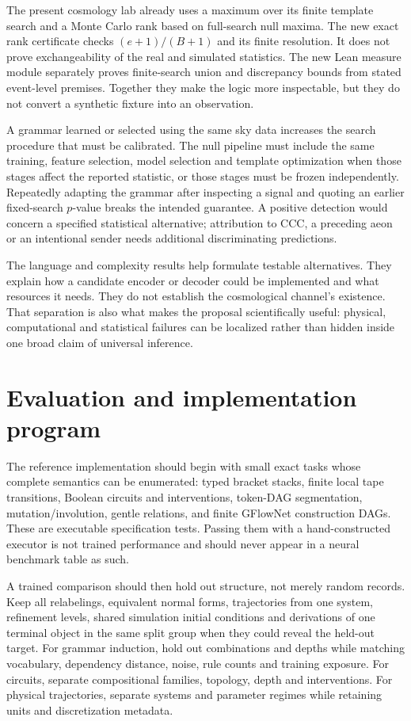 The present cosmology lab already uses a maximum over its finite template search and a Monte Carlo rank based on full-search null maxima. The new exact rank certificate checks $(e+1)/(B+1)$ and its finite resolution. It does not prove exchangeability of the real and simulated statistics. The new Lean measure module separately proves finite-search union and discrepancy bounds from stated event-level premises. Together they make the logic more inspectable, but they do not convert a synthetic fixture into an observation.

A grammar learned or selected using the same sky data increases the search procedure that must be calibrated. The null pipeline must include the same training, feature selection, model selection and template optimization when those stages affect the reported statistic, or those stages must be frozen independently. Repeatedly adapting the grammar after inspecting a signal and quoting an earlier fixed-search $p$-value breaks the intended guarantee. A positive detection would concern a specified statistical alternative; attribution to CCC, a preceding aeon or an intentional sender needs additional discriminating predictions.

The language and complexity results help formulate testable alternatives. They explain how a candidate encoder or decoder could be implemented and what resources it needs. They do not establish the cosmological channel's existence. That separation is also what makes the proposal scientifically useful: physical, computational and statistical failures can be localized rather than hidden inside one broad claim of universal inference.

\section{Evaluation and implementation program}
\label{sec:wb-language-evaluation}

The reference implementation should begin with small exact tasks whose complete semantics can be enumerated: typed bracket stacks, finite local tape transitions, Boolean circuits and interventions, token-DAG segmentation, mutation/involution, gentle relations, and finite GFlowNet construction DAGs. These are executable specification tests. Passing them with a hand-constructed executor is not trained performance and should never appear in a neural benchmark table as such.

A trained comparison should then hold out structure, not merely random records. Keep all relabelings, equivalent normal forms, trajectories from one system, refinement levels, shared simulation initial conditions and derivations of one terminal object in the same split group when they could reveal the held-out target. For grammar induction, hold out combinations and depths while matching vocabulary, dependency distance, noise, rule counts and training exposure. For circuits, separate compositional families, topology, depth and interventions. For physical trajectories, separate systems and parameter regimes while retaining units and discretization metadata.

